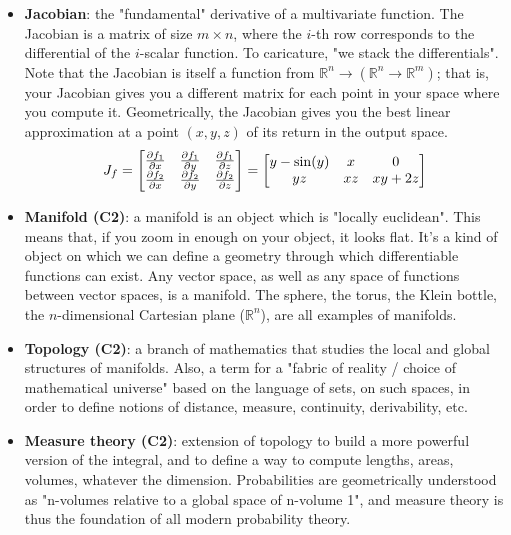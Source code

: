 \documentclass{article}
\begin{document}
\begin{itemize}
    \item \textbf{Jacobian}: the "fundamental" derivative of a multivariate function. The Jacobian is a matrix of size $m \times n$, where the $i$-th row corresponds to the differential of the $i$-scalar function. To caricature, "we stack the differentials". Note that the Jacobian is itself a function from $\mathbb{R}^n \rightarrow (\mathbb{R}^n \rightarrow \mathbb{R}^m)$; that is, your Jacobian gives you a different matrix for each point in your space where you compute it. Geometrically, the Jacobian gives you the best linear approximation at a point $(x,y,z)$ of its return in the output space.
    \begin{align*}
    	J_f
    	=
    	\begin{bmatrix}
    		\pdv{f_1}{x} & \pdv{f_1}{y} & \pdv{f_1}{z} \\
    		\pdv{f_2}{x} & \pdv{f_2}{y} & \pdv{f_2}{z}
    	\end{bmatrix}
    	=
    	\begin{bmatrix}
    		y - \sin(y) & x & 0 \\
    		yz & xz & xy + 2z
    	\end{bmatrix}
    \end{align*}
    
    \item \textbf{Manifold (C2)}: a manifold is an object which is "locally euclidean". This means that, if you zoom in enough on your object, it looks flat. It's a kind of object on which we can define a geometry through which differentiable functions can exist. Any vector space, as well as any space of functions between vector spaces, is a manifold. The sphere, the torus, the Klein bottle, the $n$-dimensional Cartesian plane ($\mathbb{R}^n$), are all examples of manifolds.
    
    \item \textbf{Topology (C2)}: a branch of mathematics that studies the local and global structures of manifolds. Also, a term for a "fabric of reality / choice of mathematical universe" based on the language of sets, on such spaces, in order to define notions of distance, measure, continuity, derivability, etc.
    
    \item \textbf{Measure theory (C2)}: extension of topology to build a more powerful version of the integral, and to define a way to compute lengths, areas, volumes, whatever the dimension. Probabilities are geometrically understood as "n-volumes relative to a global space of n-volume 1", and measure theory is thus the foundation of all modern probability theory.
    

\end{itemize}
\end{document}
